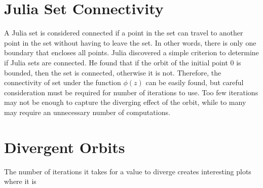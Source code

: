 \documentclass[letterpaper,11pt]{article}
\begin{document}
\section{Julia Set Connectivity}
A Julia set is considered connected if a point in the set can travel to another point in the set without having to leave the set. In other words, there is only one boundary that encloses all points. Julia discovered a simple criterion to determine if Julia sets are connected. He found that if the orbit of the initial point 0 is bounded, then the set is connected, otherwise it is not. Therefore, the connectivity of set under the function $\phi(z)$ can be easily found, but careful consideration must be required for number of iterations to use. Too few iterations may not be enough to capture the diverging effect of the orbit, while to many may require an unnecessary number of computations.

\section{Divergent Orbits}
The number of iterations it takes for a value to diverge creates interesting plots where it is 
\end{document}
